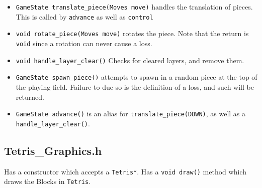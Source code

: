 \documentclass[letterpaper, 12pt]{article}
\begin{document}
\begin{itemize}
\begin{itemize}
            \item \verb|GameState translate_piece(Moves move)| handles the translation of pieces. This is called by \verb|advance| as well as \verb|control|
            \item \verb|void rotate_piece(Moves move)| rotates the piece.
                Note that the return is \verb|void| since a rotation can never cause a loss.
            \item \verb|void handle_layer_clear()| Checks for cleared layers, and remove them.
            \item \verb|GameState spawn_piece()| attempts to spawn in a random piece at the top of the playing field.
                Failure to due so is the definition of a loss, and such will be returned.
            \item \verb|GameState advance()| is an alias for \verb|translate_piece(DOWN)|, as well as a \verb|handle_layer_clear()|.
        \end{itemize}
\end{itemize}
\subsection{Tetris\_Graphics.h}
Has a constructor which accepts a \verb|Tetris*|.
Has a \verb|void draw()| method which draws the Blocks in \verb|Tetris|.
\end{document}
